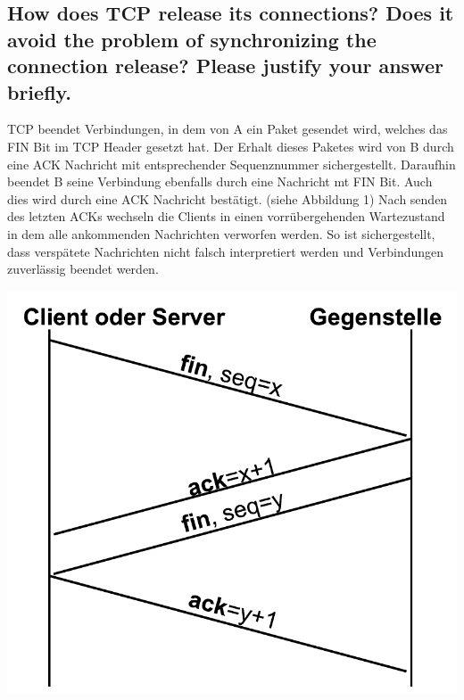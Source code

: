 \documentclass[a4paper,
			llpt,
			solution,
			accentcolor=tud2d,
			colorbacktitle
			]
			{tudexercise}
\begin{document}
\subsection{How does TCP release its connections? Does it avoid the problem of synchronizing the connection release? Please justify your answer briefly.}
TCP beendet Verbindungen, in dem von A ein Paket gesendet wird, welches das FIN Bit im TCP Header gesetzt hat. Der Erhalt dieses Paketes wird von B durch eine ACK Nachricht mit entsprechender Sequenznummer sichergestellt.
    Daraufhin beendet B seine Verbindung ebenfalls durch eine Nachricht mt FIN Bit. Auch dies wird durch eine ACK Nachricht bestätigt. (siehe Abbildung 1)
    Nach senden des letzten ACKs wechseln die Clients in einen vorrübergehenden Wartezustand in dem alle ankommenden Nachrichten verworfen werden. So ist sichergestellt, dass verspätete Nachrichten nicht falsch interpretiert werden und Verbindungen zuverlässig beendet werden.

\begin{center}
\includegraphics[scale=0.5]{tcp-teardown.pdf}
\end{center}
\end{document}
